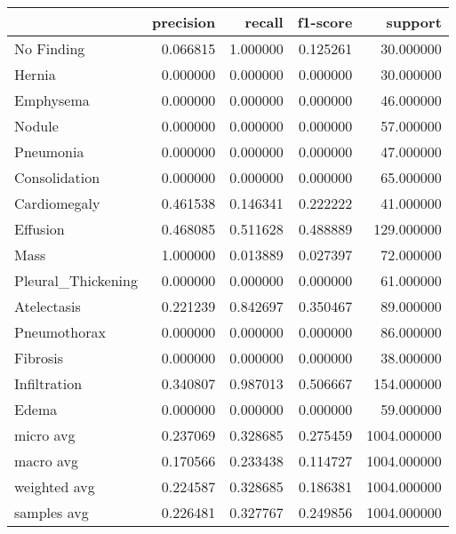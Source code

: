 \begin{tabular}{lrrrr}
\toprule
 & precision & recall & f1-score & support \\
\midrule
No Finding & 0.066815 & 1.000000 & 0.125261 & 30.000000 \\
Hernia & 0.000000 & 0.000000 & 0.000000 & 30.000000 \\
Emphysema & 0.000000 & 0.000000 & 0.000000 & 46.000000 \\
Nodule & 0.000000 & 0.000000 & 0.000000 & 57.000000 \\
Pneumonia & 0.000000 & 0.000000 & 0.000000 & 47.000000 \\
Consolidation & 0.000000 & 0.000000 & 0.000000 & 65.000000 \\
Cardiomegaly & 0.461538 & 0.146341 & 0.222222 & 41.000000 \\
Effusion & 0.468085 & 0.511628 & 0.488889 & 129.000000 \\
Mass & 1.000000 & 0.013889 & 0.027397 & 72.000000 \\
Pleural_Thickening & 0.000000 & 0.000000 & 0.000000 & 61.000000 \\
Atelectasis & 0.221239 & 0.842697 & 0.350467 & 89.000000 \\
Pneumothorax & 0.000000 & 0.000000 & 0.000000 & 86.000000 \\
Fibrosis & 0.000000 & 0.000000 & 0.000000 & 38.000000 \\
Infiltration & 0.340807 & 0.987013 & 0.506667 & 154.000000 \\
Edema & 0.000000 & 0.000000 & 0.000000 & 59.000000 \\
micro avg & 0.237069 & 0.328685 & 0.275459 & 1004.000000 \\
macro avg & 0.170566 & 0.233438 & 0.114727 & 1004.000000 \\
weighted avg & 0.224587 & 0.328685 & 0.186381 & 1004.000000 \\
samples avg & 0.226481 & 0.327767 & 0.249856 & 1004.000000 \\
\bottomrule
\end{tabular}
